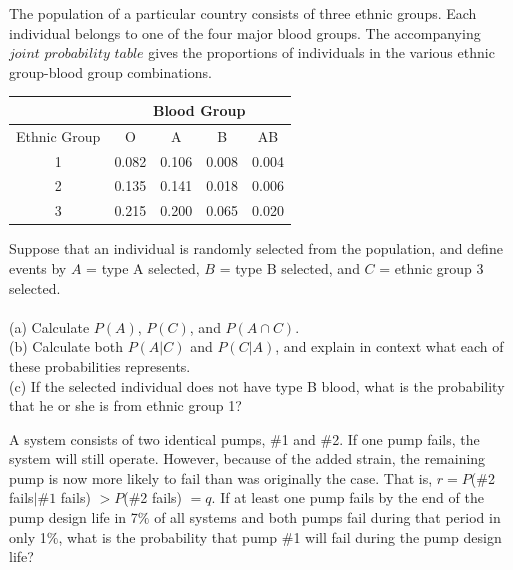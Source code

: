 \documentclass[12pt,letterpaper]{hmcpset}
\begin{document}
\begin{solution}

\end{solution}
\newpage

\begin{problem}[2.4.45]
The population of a particular country consists of three ethnic groups. Each individual belongs to one of the four major blood groups. The accompanying $\textit{joint probability table}$ gives the proportions of individuals in the various ethnic group-blood group combinations.\\
\begin{center}
	\begin{tabular}{|c||c|c|c|c|}
		\hline
		  & \multicolumn{4}{c|}{Blood Group}\\
 		\hline
 		\hline
 		Ethnic Group & O & A & B & AB \\
 		\hline
 		1 & 0.082 & 0.106 & 0.008 & 0.004 \\
 		2 & 0.135 & 0.141 & 0.018 & 0.006\\
 		3 & 0.215 & 0.200 & 0.065 & 0.020\\
 		 \hline
	 \end{tabular}

\end{center}
Suppose that an individual is randomly selected from the population, and define events by $A$ = {type A selected}, $B$ = {type B selected}, and $C$ = {ethnic group 3 selected}.
\\ \\
(a) Calculate $P(A)$, $P(C)$, and $P(A\cap C)$.
\\
	(b) Calculate both $P(A|C)$ and $P(C|A)$, and explain in context what each of these probabilities represents.
\\
(c) If the selected individual does not have type B blood, what is the probability that he or she is from ethnic group 1?

\end{problem}

\begin{solution}

\end{solution}
\newpage

\begin{problem}[2.4.52]
A system consists of two identical pumps, $\#$1 and $\#$2. If one pump fails, the system will still operate. However, because of the added strain, the remaining pump is now more likely to fail than was originally the case. That is, $r = P$($\#$2 fails$|\#1$ fails) $> P$($\#$2 fails) $= q$. If at least one pump fails by the end of the pump design life in 7$\%$ of all systems and both pumps fail during that period in only 1$\%$, what is the probability that pump $\#$1 will fail during the pump design life?
\end{problem}
\end{document}
